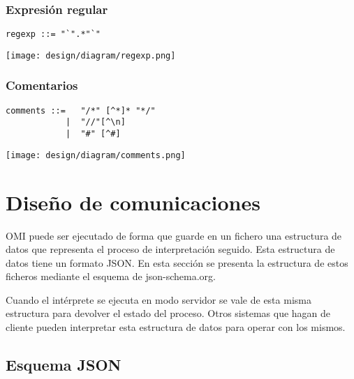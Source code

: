 \subsubsection{Expresión regular}
\begin{multicols}{2}
\begin{lstlisting}[style=nonumbers]      
regexp ::= "`".*"`" 
\end{lstlisting}  
\columnbreak	
\begin{center}
\texttt{[image: design/diagram/regexp.png]} 
\end{center}
\end{multicols}

\subsubsection{Comentarios}
\begin{multicols}{2}
\begin{lstlisting}[style=nonumbers]      
comments ::=   "/*" [^*]* "*/"
            |  "//"[^\n]
            |  "#" [^#]
\end{lstlisting}  
\columnbreak	
\begin{center}
\texttt{[image: design/diagram/comments.png]} 
\end{center}
\end{multicols}

\section{Diseño de comunicaciones}
OMI puede ser ejecutado de forma que guarde en un fichero una estructura de datos que representa el proceso de interpretación seguido. 
Esta estructura de datos tiene un formato JSON. En esta sección se presenta la estructura de estos ficheros mediante el esquema de 
json-schema.org.

Cuando el intérprete se ejecuta en modo servidor se vale de esta misma estructura para devolver el estado del proceso. Otros sistemas
que hagan de cliente pueden interpretar esta estructura de datos para operar con los mismos. 
\subsection{Esquema JSON}

